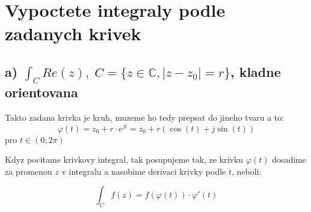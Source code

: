 \newpage

\section{Vypoctete integraly podle zadanych krivek}
\subsection{a) $\int_C Re(z), \; C=\{z \in \mathbb{C}, |z-z_0|=r\}$, kladne orientovana}

Takto zadana krivka je kruh, muzeme ho tedy prepsat do jineho tvaru a to:
$$\varphi(t) = z_0 + r\cdot e^{jt} = z_0 + r(\operatorname{cos}(t)+j\operatorname{sin}(t))$$
pro $t \in (0;2\pi)$

Kdyz pocitame krivkovy integral, tak posupujeme tak, ze krivku $\varphi(t)$ dosadime za promenou $z$ v integralu a nasobime derivaci krivky podle $t$, neboli:

$$\int_C f(z) = f(\varphi(t))\cdot \varphi ' (t)$$

